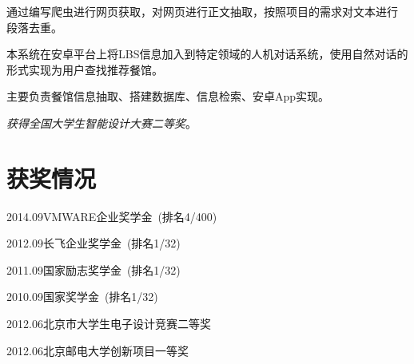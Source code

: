 \documentclass[11pt,a4paper]{cjkresume}
\begin{document}
\begin{workitemize}
  \item 通过编写爬虫进行网页获取，对网页进行正文抽取，按照项目的需求对文本进行
    段落去重。
\end{workitemize}

\begin{workitemize}
  \item 本系统在安卓平台上将LBS信息加入到特定领域的人机对话系统，使用自然对话的
    形式实现为用户查找推荐餐馆。
  \item 主要负责餐馆信息抽取、搭建数据库、信息检索、安卓App实现。
  \item \emph{获得全国大学生智能设计大赛二等奖}。
\end{workitemize}

\section{获奖情况}
\noindent\begin{minipage}{0.5\textwidth}
  \begin{workitemize}
    \item 2014.09\quad{}VMWARE企业奖学金~(排名4/400)
    \item 2012.09\quad{}长飞企业奖学金~(排名1/32)
    \item 2011.09\quad{}国家励志奖学金~(排名1/32)
  \end{workitemize}
\end{minipage}%
\hfill
\begin{minipage}{0.5\textwidth}
  \begin{workitemize}
    \item 2010.09\quad{}国家奖学金~(排名1/32)
    \item 2012.06\quad{}北京市大学生电子设计竞赛二等奖
    \item 2012.06\quad{}北京邮电大学创新项目一等奖
  \end{workitemize}
\end{minipage}%
\end{document}
